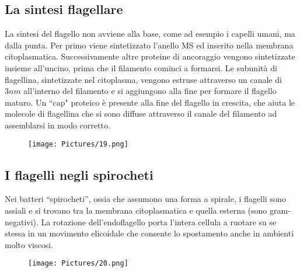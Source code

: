 \subsection{La sintesi flagellare}
La sintesi del flagello non avviene alla base, come ad esempio i capelli umani, ma dalla punta. Per primo viene sintetizzato l’anello MS ed inserito nella 
membrana citoplasmatica. Successivamente altre proteine di ancoraggio vengono sintetizzate insieme all’uncino, prima che il filamento cominci a formarsi. Le 
subunità di flagellina, sintetizzate nel citoplasma, vengono estruse attraverso un canale di $3 nm$ all'interno del filamento e si aggiungono alla fine per 
formare il flagello maturo. Un ``cap" proteico è presente alla fine del flagello in crescita, che aiuta le molecole di flagellina che si sono diffuse 
attraverso il canale del filamento ad assemblarsi in modo corretto. 
\begin{figure}[H]
	\texttt{[image: Pictures/19.png]}
\end{figure}
\subsection{I flagelli negli spirocheti}
Nei batteri ``spirocheti”, ossia che assumono una forma a spirale, i flagelli sono assiali e si trovano tra la membrana citoplasmatica e quella esterna (sono 
gram-negativi). La rotazione dell’endoflagello porta l’intera cellula a ruotare su se stessa in un movimento elicoidale che consente lo spostamento anche in 
ambienti molto viscosi.
\begin{figure}[H]
	\texttt{[image: Pictures/20.png]}
\end{figure}
